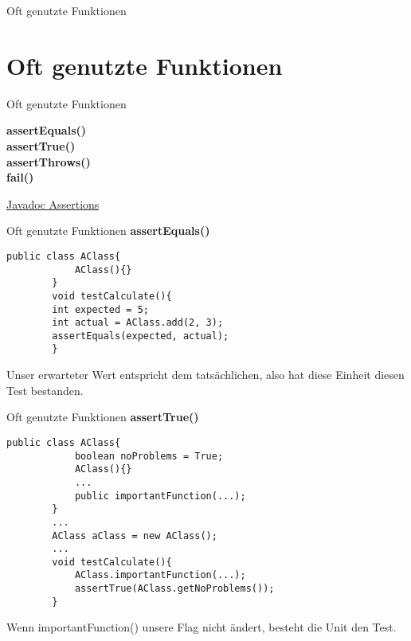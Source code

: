 \documentclass[10pt]{beamer}
\begin{document}
\begin{frame}[fragile]{Oft genutzte Funktionen}
    \section{Oft genutzte Funktionen}
\end{frame}

\begin{frame}[fragile]{Oft genutzte Funktionen}
    
     \textcolor{mygreen}{\textbf{assertEquals()}} \\
     \textcolor{mygreen}{\textbf{assertTrue()}} \\
     \textcolor{mygreen}{\textbf{assertThrows()}} \\
     \textcolor{mygreen}{\textbf{fail()}}

    \href{{https://junit.org/junit5/docs/current/api/org/junit/jupiter/api/Assertions.html}}{Javadoc Assertions}
\end{frame}

\begin{frame}[fragile]{Oft genutzte Funktionen}
     \textcolor{mygreen}{\textbf{assertEquals()}}

    \begin{lstlisting}[basicstyle=\ttfamily\scriptsize,gobble=8]
        public class AClass{
			AClass(){}
		}	 
		void testCalculate(){
		int expected = 5;
		int actual = AClass.add(2, 3);
        assertEquals(expected, actual); 
        }
    \end{lstlisting}
    Unser erwarteter Wert entspricht dem tatsächlichen, \newline 
    also hat diese Einheit diesen Test bestanden.
\end{frame}

\begin{frame}[fragile]{Oft genutzte Funktionen}
     \textcolor{mygreen}{\textbf{assertTrue()}}

    \begin{lstlisting}[basicstyle=\ttfamily\scriptsize,gobble=8]
        public class AClass{
			boolean noProblems = True;
			AClass(){}
			...
			public importantFunction(...);
		}	
		...
		AClass aClass = new AClass();
		...
		void testCalculate(){	
			AClass.importantFunction(...);
        	assertTrue(AClass.getNoProblems()); 
        }
    \end{lstlisting}
    Wenn importantFunction() unsere Flag nicht ändert,  besteht die Unit den Test.
\end{frame}
\end{document}
